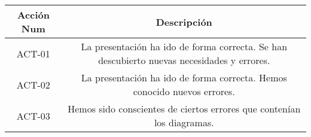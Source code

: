 
\begin{center}
\begin{tabular}{|c|c|}
\hline
{\cellcolor[gray]{.8} \bf Acción Num} & {\cellcolor[gray]{.8} \bf Descripción}  \\
\hline
ACT-01 & La presentación ha ido de forma correcta. Se han descubierto nuevas necesidades y errores. \\
\hline
ACT-02 & La presentación ha ido de forma correcta. Hemos conocido nuevos errores. \\
\hline
ACT-03 & Hemos sido conscientes de ciertos errores que contenían los diagramas. \\
\hline
\end{tabular}
\end{center}
